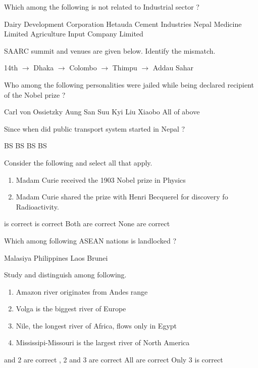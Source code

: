 \begin{questions}
\question Which among the following is not related to Industrial sector ?
  \begin{choices}
  \choice Dairy Development Corporation
  \choice Hetauda Cement Industries
  \choice Nepal Medicine Limited
  \CorrectChoice Agriculture Input Company Limited
  \end{choices}

\question SAARC summit and venues are given below. Identify the mismatch.
  \begin{choices}
  \CorrectChoice 14th $\longrightarrow$ Dhaka
   $\longrightarrow$ Colombo
   $\longrightarrow$ Thimpu
   $\longrightarrow$ Addau Sahar
  \end{choices}

\question Who among the following personalities were jailed while being declared recipient of the Nobel prize ?
  \begin{choices}
  \choice Carl von Ossietzky
  \choice Aung San Suu Kyi
  \choice Liu Xiaobo
  \CorrectChoice All of above
  \end{choices}

\question Since when did public transport system started in Nepal ?
  \begin{choices}
   BS
   BS
   BS
   BS
  \end{choices}

\question Consider the following and select all that apply.
  \begin{enumerate}
  \item Madam Curie received the 1903 Nobel prize in Physics
  \item Madam Curie shared the prize with Henri Becquerel for discovery fo Radioactivity.
  \end{enumerate}

  \begin{choices}
   is correct
   is correct
  \CorrectChoice Both are correct
  \choice None are correct
  \end{choices}

\question Which among following ASEAN nations is landlocked ?
  \begin{choices}
  \choice Malasiya
  \choice Philippines
  \CorrectChoice Laos
  \choice Brunei
  \end{choices}

\question Study and distinguish among following.
  \begin{enumerate}
  \item Amazon river originates from Andes range
  \item Volga is the biggest river of Europe
  \item Nile, the longest river of Africa, flows only in Egypt
  \item Mississipi-Missouri is the largest river of North America
  \end{enumerate}
  \begin{choices}
   and 2 are correct
  , 2 and 3 are correct
  \choice All are correct
  \CorrectChoice Only 3 is correct
  \end{choices}


\end{questions}
